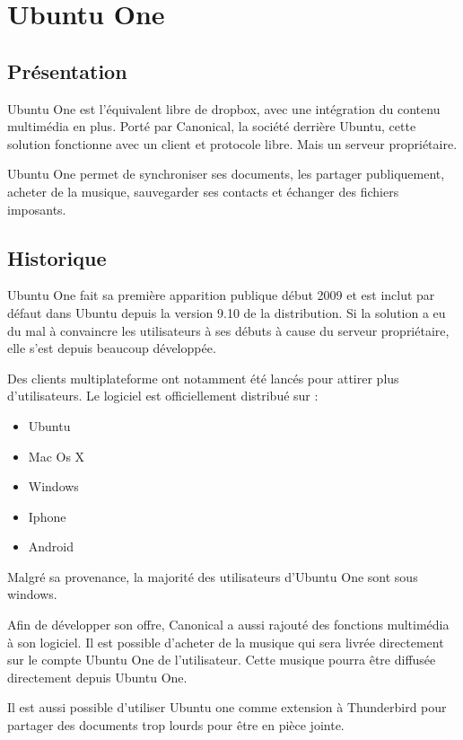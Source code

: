 \section{Ubuntu One}
\thispagestyle{EIP} %
\subsection{Présentation}
Ubuntu One est l'équivalent libre de dropbox, avec une intégration du contenu multimédia en plus. Porté par Canonical, la société derrière Ubuntu, cette solution fonctionne avec un client et protocole libre. Mais un serveur propriétaire.

Ubuntu One permet de synchroniser ses documents, les partager publiquement, acheter de la musique, sauvegarder ses contacts et échanger des fichiers imposants.

\subsection{Historique}
Ubuntu One fait sa première apparition publique début 2009 et est inclut par défaut dans Ubuntu depuis la version 9.10 de la distribution. Si la solution a eu du mal à convaincre les utilisateurs à ses débuts à cause du serveur propriétaire, elle s'est depuis beaucoup développée.

Des clients multiplateforme ont notamment été lancés pour attirer plus d'utilisateurs. Le logiciel est officiellement distribué sur :

\begin{itemize}
\renewcommand{\labelitemi}{$\bullet$}
\item Ubuntu
\item Mac Os X
\item Windows
\item Iphone
\item Android
\end{itemize}

Malgré sa provenance, la majorité des utilisateurs d'Ubuntu One sont sous windows.

Afin de développer son offre, Canonical a aussi rajouté des fonctions multimédia à son logiciel. Il est possible d'acheter de la musique qui sera livrée directement sur le compte Ubuntu One de l'utilisateur. Cette musique pourra être diffusée directement depuis Ubuntu One.

Il est aussi possible d'utiliser Ubuntu one comme extension à Thunderbird pour partager des documents trop lourds pour être en pièce jointe.

